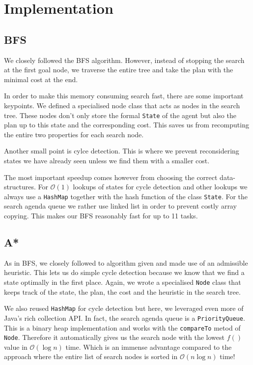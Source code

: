 \documentclass[11pt]{article}
\begin{document}
\section{Implementation}

\subsection{BFS}
We closely followed the BFS algorithm. However, instead of stopping the 
search at the first goal node, we traverse the entire tree and take the plan 
with the minimal cost at the end. 

In order to make this memory consuming search fast, there are some 
important keypoints. We defined a specialised node class that acts as nodes in 
the search tree. These nodes don't only store the formal \texttt{State} of the 
agent but also the plan up to this state and the corresponding cost. This 
saves us from recomputing the entire two properties for each search node.

Another small point is cylce detection. This is where we prevent reconsidering 
states we have already seen unless we find them with a smaller cost.

The most important speedup comes however from choosing the correct data-structures.
For $\mathcal{O}(1)$ lookups of states for cycle detection and other lookups we 
always use a \texttt{HashMap} together with the hash function of the class 
\texttt{State}.
For the search agenda queue we rather use linked list in order to prevent costly 
array copying. This makes our BFS reasonably fast for up to 11 tasks.

\subsection{A*}
As in BFS, we closely followed to algorithm given and made use of an admissible 
heuristic. This lets us do simple cycle detection because we know that we find a 
state optimally in the first place. Again, we wrote a specialised \texttt{Node} 
class that keeps track of the state, the plan, the cost and the heuristic in the 
search tree.

We also reused \texttt{HashMap} for cycle detection but here,
 we leveraged even more of Java's rich collection API. In fact, the search 
agenda queue is a \texttt{PriorityQueue}. This is a binary heap implementation 
and works with the \texttt{compareTo} metod of \texttt{Node}. Therefore it automatically 
gives us the search node with the lowest $f()$ value in $\mathcal{O}(\log n)$ 
time. Which is an immense advantage compared to the approach where the entire 
list of search nodes is sorted in $\mathcal{O}(n \log n)$ time!
\end{document}
